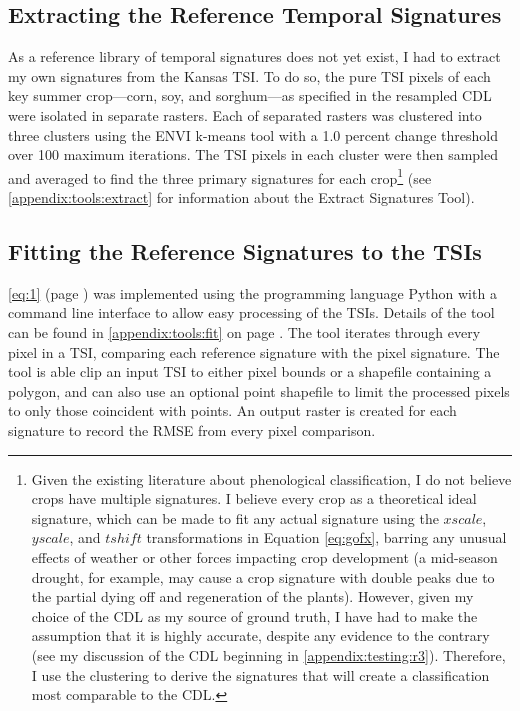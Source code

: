 \subsection{Extracting the Reference Temporal Signatures}

As a reference library of temporal signatures does not yet exist, I had to extract my own signatures from the Kansas TSI. To do so, the pure TSI pixels of each key summer crop---corn, soy, and sorghum---as specified in the resampled CDL were isolated in separate rasters. Each of separated rasters was clustered into three clusters using the ENVI \autocite{envi5.0} k-means tool with a 1.0 percent change threshold over 100 maximum iterations. The TSI pixels in each cluster were then sampled and averaged to find the three primary signatures for each crop\footnote{Given the existing literature about phenological classification, I do not believe crops have multiple signatures. I believe every crop as a theoretical ideal signature, which can be made to fit any actual signature using the $xscale$, $yscale$, and $tshift$ transformations in Equation \ref{eq:gofx}, barring any unusual effects of weather or other forces impacting crop development (a mid-season drought, for example, may cause a crop signature with double peaks due to the partial dying off and regeneration of the plants). However, given my choice of the CDL as my source of ground truth, I have had to make the assumption that it is highly accurate, despite any evidence to the contrary (see my discussion of the CDL beginning in \autoref{appendix:testing:r3}). Therefore, I use the clustering to derive the signatures that will create a classification most comparable to the CDL.} (see \autoref{appendix:tools:extract} for information about the Extract Signatures Tool).

\subsection{Fitting the Reference Signatures to the TSIs}

\autoref{eq:1} (page \pageref{eq:1}) was implemented using the programming language Python \autocite{python2.7.8} with a command line interface to allow easy processing of the TSIs. Details of the tool can be found in \autoref{appendix:tools:fit} on page \pageref{appendix:tools:fit}. The tool iterates through every pixel in a TSI, comparing each reference signature with the pixel signature. The tool is able clip an input TSI to either pixel bounds or a shapefile containing a polygon, and can also use an optional point shapefile to limit the processed pixels to only those coincident with points. An output raster is created for each signature to record the RMSE from every pixel comparison.

